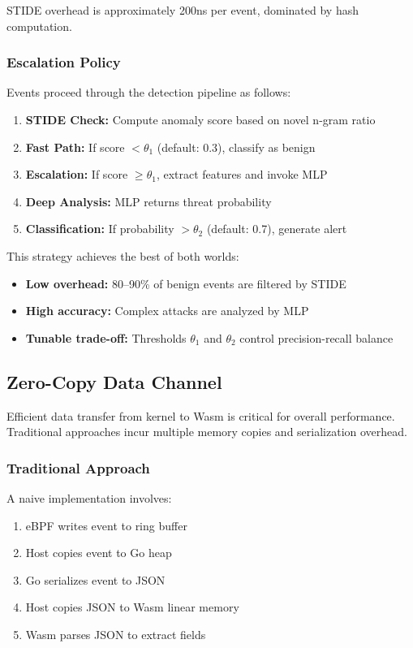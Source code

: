 STIDE overhead is approximately 200ns per event, dominated by hash computation.

\subsubsection{Escalation Policy}

Events proceed through the detection pipeline as follows:

\begin{enumerate}
    \item \textbf{STIDE Check:} Compute anomaly score based on novel n-gram ratio
    \item \textbf{Fast Path:} If score $< \theta_1$ (default: 0.3), classify as benign
    \item \textbf{Escalation:} If score $\geq \theta_1$, extract features and invoke MLP
    \item \textbf{Deep Analysis:} MLP returns threat probability
    \item \textbf{Classification:} If probability $> \theta_2$ (default: 0.7), generate alert
\end{enumerate}

This strategy achieves the best of both worlds:
\begin{itemize}
    \item \textbf{Low overhead:} 80--90\% of benign events are filtered by STIDE
    \item \textbf{High accuracy:} Complex attacks are analyzed by MLP
    \item \textbf{Tunable trade-off:} Thresholds $\theta_1$ and $\theta_2$ control precision-recall balance
\end{itemize}

\subsection{Zero-Copy Data Channel}
\label{sec:design-zerocopy}

Efficient data transfer from kernel to Wasm is critical for overall performance.
Traditional approaches incur multiple memory copies and serialization overhead.

\subsubsection{Traditional Approach}

A naive implementation involves:
\begin{enumerate}
    \item eBPF writes event to ring buffer
    \item Host copies event to Go heap
    \item Go serializes event to JSON
    \item Host copies JSON to Wasm linear memory
    \item Wasm parses JSON to extract fields
\end{enumerate}

